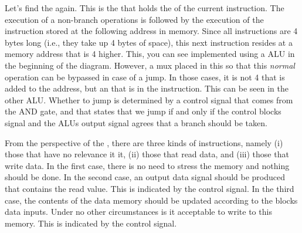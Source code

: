 Let's find the  again. This is the  that holds the  of the current instruction. The execution of a non-branch operations is followed by the execution of the instruction stored at the following address in memory. Since all instructions are 4 bytes long (i.e., they take up 4 bytes of space), this next instruction resides at a memory address that is 4 higher. This, you can see implemented using a \say{+} ALU in the beginning of the diagram. However, a mux placed in this so that this \textsl{normal} operation can be bypassed in case of a jump. In those cases, it is not 4 that is added to the address, but an  that is  in the instruction. This can be seen in the other \say{+} ALU. Whether to jump is determined by a control signal that comes from the AND gate, and that states that we jump if and only if the control blocks  signal and the ALUs output signal agrees that a branch should be taken.

From the perspective of the , there are three kinds of instructions, namely (i) those that have no relevance it it, (ii) those that read data, and (iii) those that write data. In the first case, there is no need to stress the memory and nothing should be done. In the second case, an output data signal should be produced that contains the read value. This is indicated by the  control signal. In the third case, the contents of the data memory should be updated according to the blocks data inputs. Under no other circumstances is it acceptable to write to this memory. This is indicated by the  control signal.


